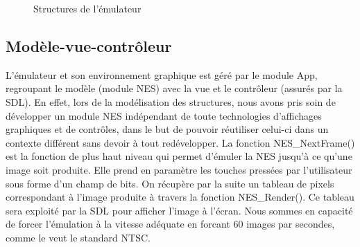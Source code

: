 \begin{figure}[H]
	\centering
  \hspace{2cm}
  \caption{Structures de l'émulateur}
  \label{fig:structure}
\end{figure}

\paragraph{}

\subsection{Modèle-vue-contrôleur}

L’émulateur et son environnement graphique est géré par le module App, regroupant le modèle (module NES) avec la vue et le contrôleur (assurés par la SDL). En effet, lors de la modélisation des structures, nous avons pris soin de développer un module NES indépendant de toute technologies d'affichages graphiques et de contrôles, dans le but de pouvoir réutiliser celui-ci dans un contexte différent sans devoir à tout redévelopper. La fonction NES\_NextFrame() est la fonction de plus haut niveau qui permet d'émuler la NES jusqu’à ce qu'une image soit produite. Elle prend en paramètre les touches pressées par l'utilisateur sous forme d'un champ de bits. On récupère par la suite un tableau de pixels correspondant à l'image produite à travers la fonction NES\_Render(). Ce tableau sera exploité par la SDL pour afficher l'image à l'écran. Nous sommes en capacité de forcer l'émulation à la vitesse adéquate en forcant 60 images par secondes, comme le veut le standard NTSC.

